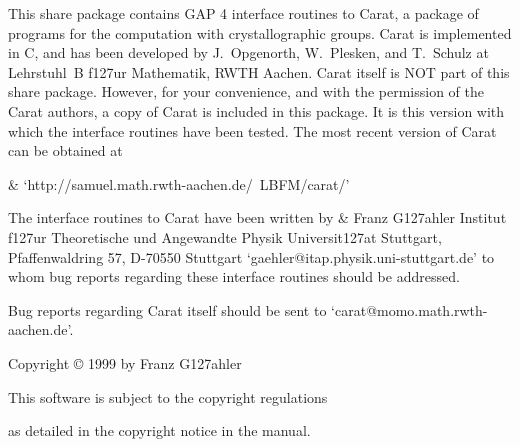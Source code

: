 
This share package contains GAP 4 interface routines to Carat, 
a package of programs for the computation with crystallographic
groups. Carat is implemented in C, and has been developed by
J.~Opgenorth, W.~Plesken, and T.~Schulz at Lehrstuhl~B f\accent127ur 
Mathematik, RWTH Aachen. Carat itself is NOT part of this share 
package. However, for your convenience, and with the permission
of the Carat authors, a copy of Carat is included in this package. 
It is this version with which the interface routines have been
tested. The most recent version of Carat can be obtained at

\beginitems
&
`http://samuel.math.rwth-aachen.de/~LBFM/carat/'
\enditems
 
The {\GAP} interface routines to Carat have been written by
\beginitems
&
Franz G\accent127ahler \hfill\break
Institut f\accent127ur Theoretische und Angewandte Physik \hfill\break
Universit\accent127at Stuttgart, Pfaffenwaldring 57, 
D-70550 Stuttgart\hfill\break
`gaehler@itap.physik.uni-stuttgart.de'
\enditems
to whom bug reports regarding these interface routines should be
addressed. 

Bug reports regarding Carat itself should be sent to
`carat@momo.math.rwth-aachen.de'.

\vfill
\centerline{Copyright {\copyright} 1999 by Franz G\accent127ahler}\bigskip
\smallskip
\centerline{This software is subject to the {\GAP} copyright regulations}
\centerline{as detailed in the copyright notice in the {\GAP} manual.}


